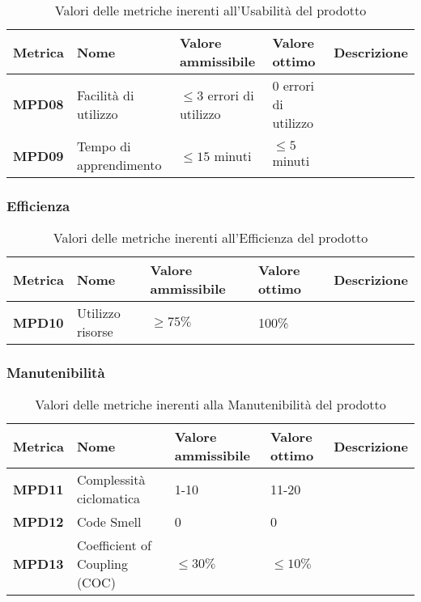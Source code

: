 \documentclass[italian,12pt]{article} %
\begin{document}
\begin{table}[h!]
	\centering
	\begin{tabularx}{\textwidth}{|X|X|X|X|X|} 	 
		\hline
		\textbf{Metrica} 	& \textbf{Nome} & \textbf{Valore ammissibile} & \textbf{Valore ottimo} & \textbf{Descrizione}\\  	 
		\hline
		\textbf{MPD08} & Facilità di utilizzo & $\leq 3 $ errori di utilizzo & 0 errori di utilizzo &\\
		\hline
		\textbf{MPD09} & Tempo di apprendimento & $\leq 15 $ minuti  & $\leq 5 $ minuti & \\ 
		\hline
	\end{tabularx}
	\caption{ Valori delle metriche inerenti all'Usabilità del prodotto}
	\label{table:9}
\end{table}

\subsubsection{Efficienza}

\begin{table}[h!]
	\centering
	\begin{tabularx}{\textwidth}{|X|X|X|X|X|} 	 
		\hline
		\textbf{Metrica} 	& \textbf{Nome} & \textbf{Valore ammissibile} & \textbf{Valore ottimo} & \textbf{Descrizione}\\  	 
		\hline
		\textbf{MPD10} & Utilizzo risorse & $\geq 75\% $  & 100\% & \\
		\hline
	\end{tabularx}
	\caption{ Valori delle metriche inerenti all'Efficienza del prodotto}
	\label{table:10}
	\end{table}

\subsubsection{Manutenibilità}

\begin{table}[h!]
	\centering
	\begin{tabularx}{\textwidth}{|X|X|X|X|X|} 	 
		\hline
		\textbf{Metrica} 	& \textbf{Nome} & \textbf{Valore ammissibile} & \textbf{Valore ottimo} & \textbf{Descrizione}\\  	 
		\hline
		\textbf{MPD11} & Complessità ciclomatica & 1-10 & 11-20 & \\
		\hline
		\textbf{MPD12} & Code Smell & 0 & 0 & \\ 
		\hline
		\textbf{MPD13} & Coefficient of Coupling (COC) & $\leq 30\% $ & $\leq 10\% $ & \\ 
		\hline
	\end{tabularx}
	\caption{ Valori delle metriche inerenti alla Manutenibilità del prodotto}
	\label{table:11}
\end{table}
\end{document}
